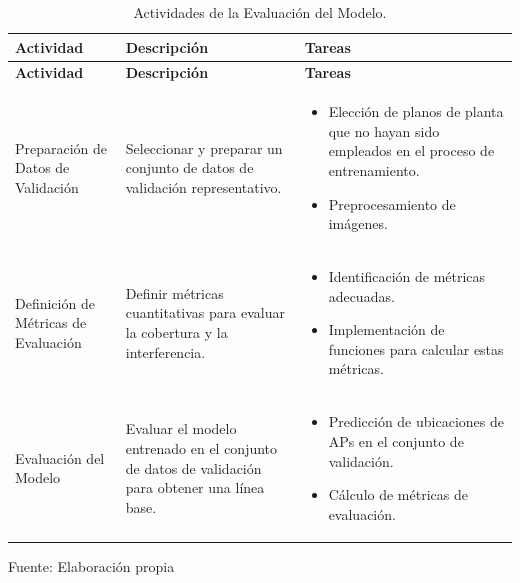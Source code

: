 \begin{longtable}{|>{\raggedright\arraybackslash}p{4cm}|>{\raggedright\arraybackslash}p{5cm}|>{\raggedright\arraybackslash}p{6cm}|}
    \caption{Actividades de la Evaluación del Modelo.}
    \label{tabla:actividades}\\
    \hline
    \textbf{Actividad} & \textbf{Descripción} & \textbf{Tareas} \\
    \hline
    \endfirsthead

    \hline
    \textbf{Actividad} & \textbf{Descripción} & \textbf{Tareas} \\
    \hline
    \endhead

    \hline
    \endfoot

    \hline
    \endlastfoot

    Preparación de Datos de Validación & Seleccionar y preparar un conjunto de datos de validación representativo. & 
    \begin{itemize}
        \item Elección de planos de planta que no hayan sido empleados en el proceso de entrenamiento.
        \item Preprocesamiento de imágenes.
    \end{itemize} \\
    \hline
    Definición de Métricas de Evaluación & Definir métricas cuantitativas para evaluar la cobertura y la interferencia. & 
    \begin{itemize}
        \item Identificación de métricas adecuadas.
        \item Implementación de funciones para calcular estas métricas.
    \end{itemize} \\
    \hline
    Evaluación del Modelo & Evaluar el modelo entrenado en el conjunto de datos de validación para obtener una línea base. & 
    \begin{itemize}
        \item Predicción de ubicaciones de APs en el conjunto de validación.
        \item Cálculo de métricas de evaluación.
    \end{itemize} \\
    \hline
\end{longtable}
\begin{flushleft}	%
	\small Fuente: Elaboración propia
\end{flushleft}

